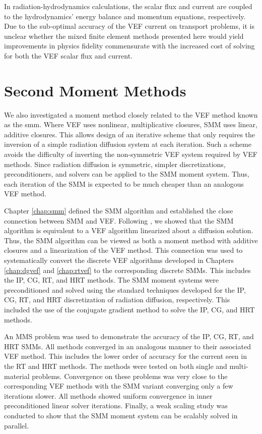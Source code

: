 \documentclass[../doc.tex]{subfiles}
\begin{document}
In radiation-hydrodynamics calculations, the scalar flux and current are coupled to the hydrodynamics' energy balance and momentum equations, respectively. 
Due to the sub-optimal accuracy of the VEF current on transport problems, it is unclear whether the mixed finite element methods presented here would yield improvements in physics fidelity commensurate with the increased cost of solving for both the VEF scalar flux and current. 

\section{Second Moment Methods}
We also investigated a moment method closely related to the VEF method known as the \gls{smm}. Where VEF uses nonlinear, multiplicative closures, SMM uses linear, additive closures. This allows design of an iterative scheme that only requires the inversion of a simple radiation diffusion system at each iteration. Such a scheme avoids the difficulty of inverting the non-symmetric VEF system required by VEF methods. Since radiation diffusion is symmetric, simpler discretizations, preconditioners, and solvers can be applied to the SMM moment system. Thus, each iteration of the SMM is expected to be much cheaper than an analogous VEF method. 

Chapter \ref{chap:smm} defined the SMM algorithm and established the close connection between SMM and VEF. Following \textcite{cefus}, we showed that the SMM algorithm is equivalent to a VEF algorithm linearized about a diffusion solution. Thus, the SMM algorithm can be viewed as both a moment method with additive closures and a linearization of the VEF method. This connection was used to systematically convert the discrete VEF algorithms developed in Chapters \ref{chap:dgvef} and \ref{chap:rtvef} to the corresponding discrete SMMs. This includes the IP, CG, RT, and HRT methods. The SMM moment systems were preconditioned and solved using the standard techniques developed for the IP, CG, RT, and HRT discretization of radiation diffusion, respectively. This included the use of the conjugate gradient method to solve the IP, CG, and HRT methods. 

An MMS problem was used to demonstrate the accuracy of the IP, CG, RT, and HRT SMMs. All methods converged in an analogous manner to their associated VEF method. This includes the lower order of accuracy for the current seen in the RT and HRT methods. The methods were tested on both single and multi-material problems. Convergence on these problems was very close to the corresponding VEF methods with the SMM variant converging only a few iterations slower. All methods showed uniform convergence in inner preconditioned linear solver iterations. Finally, a weak scaling study was conducted to show that the SMM moment system can be scalably solved in parallel. 
\end{document}
